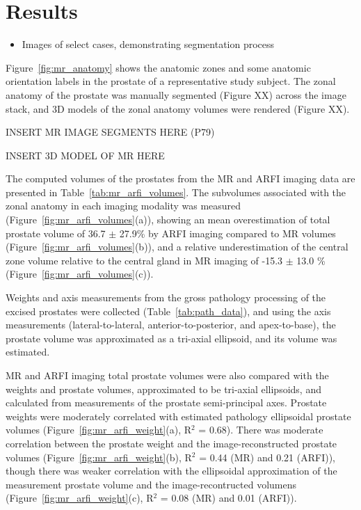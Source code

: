 \section{Results}\label{sect:results}

\begin{itemize}
    \item Images of select cases, demonstrating segmentation process
\end{itemize}

Figure~\ref{fig:mr_anatomy} shows the anatomic zones and some anatomic
orientation labels in the prostate of a representative study subject.  The
zonal anatomy of the prostate was manually segmented (Figure XX) across the
image stack, and 3D models of the zonal anatomy volumes were rendered (Figure
XX).



INSERT MR IMAGE SEGMENTS HERE (P79)

INSERT 3D MODEL OF MR HERE

The computed volumes of the prostates from the MR and ARFI imaging data are
presented in Table~\ref{tab:mr_arfi_volumes}.  The subvolumes associated
with the zonal anatomy in each imaging modality was measured
(Figure~\ref{fig:mr_arfi_volumes}(a)), showing an mean overestimation of
total prostate volume of 36.7 $\pm$ 27.9\% by ARFI imaging compared to MR
volumes (Figure~\ref{fig:mr_arfi_volumes}(b)), and a relative
underestimation of the central zone volume relative to the central gland in MR
imaging of -15.3 $\pm$ 13.0 \% (Figure~\ref{fig:mr_arfi_volumes}(c)).





Weights and axis measurements from the gross pathology processing of the
excised prostates were collected (Table~\ref{tab:path_data}), and using the
axis measurements (lateral-to-lateral, anterior-to-posterior, and
apex-to-base), the prostate volume was approximated as a tri-axial ellipsoid,
and its volume was estimated.



MR and ARFI imaging total prostate volumes were also compared with the weights
and prostate volumes, approximated to be tri-axial ellipsoids, and calculated
from measurements of the prostate semi-principal axes.  Prostate weights were
moderately correlated with estimated pathology ellipsoidal prostate volumes
(Figure~\ref{fig:mr_arfi_weight}(a), R$^2$ = 0.68).  There was moderate
correlation between the prostate weight and the image-reconstructed prostate
volumes (Figure~\ref{fig:mr_arfi_weight}(b), R$^2$ = 0.44 (MR) and 0.21
(ARFI)), though there was weaker correlation with the ellipsoidal approximation
of the measurement prostate volume and the image-recontructed volumens
(Figure~\ref{fig:mr_arfi_weight}(c), R$^2$ = 0.08 (MR) and 0.01 (ARFI)).  

